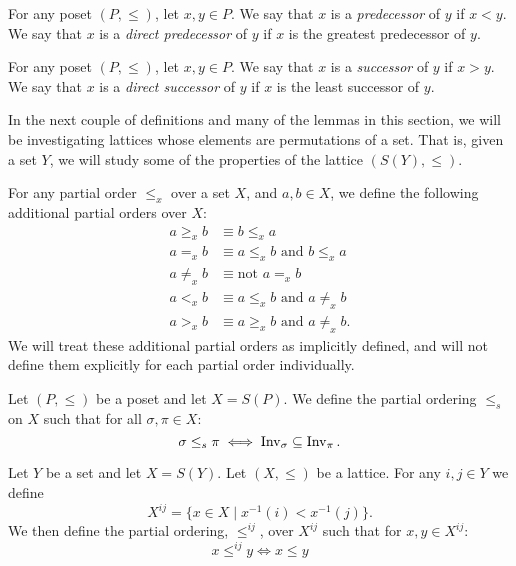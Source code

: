 	\begin{definition}
		For any poset $(P, \le)$, let $x,y \in P$. We say that $x$ is a \emph{predecessor} of $y$ if $x < y$. We say that $x$ is a \emph{direct predecessor} of $y$ if $x$ is the greatest predecessor of $y$.
	\end{definition}

	\begin{definition}
		For any poset $(P, \le)$, let $x,y \in P$. We say that $x$ is a \emph{successor} of $y$ if $x > y$. We say that $x$ is a \emph{direct successor} of $y$ if $x$ is the least successor of $y$.
	\end{definition}

	In the next couple of definitions and many of the lemmas in this section, we will be investigating lattices whose elements are permutations of a set. That is, given a set $Y$, we will study some of the properties of the lattice $(S(Y), \le)$.

	\begin{definition}
		For any partial order $\le_x$ over a set $X$, and $a, b \in X$, we define the following additional partial orders over $X$:
		\begin{align*}
			a \ge_x b &\equiv b \le_x a \\
			a =_x b &\equiv a \le_x b \text{ and } b \le_x a \\
			a \ne_x b &\equiv \text{not } a =_x b \\
			a <_x b &\equiv a \le_x b \text{ and } a \ne_x b \\
			a >_x b &\equiv a \ge_x b \text{ and } a \ne_x b.
		\end{align*}
		We will treat these additional partial orders as implicitly defined, and will not define them explicitly for each partial order individually.
	\end{definition}

	\begin{definition}[$\le_s$]
		\label{partial-order-s-definition}
		Let $(P, \le)$ be a poset and let $X = S(P)$. We define the partial ordering $\le_s$ on $X$ such that for all $\sigma, \pi \in X$:
		\[
			\sigma \le_s \pi \iff \operatorname{Inv}_{\sigma} \subseteq \operatorname{Inv}_{\pi}.
		\]
	\end{definition}

	\begin{definition}[$X^{ij}, \le^{ij}$]
		\label{identified-lattice-definition}
		Let $Y$ be a set and let $X = S(Y)$. Let $(X, \le)$ be a lattice. For any $i,j \in Y$ we define
		\[
			X^{ij} = \{ x \in X \mid x^{-1}(i) < x^{-1}(j) \}.
		\]
		We then define the partial ordering, $\le^{ij}$, over $X^{ij}$ such that for $x, y \in X^{ij}$:
		\[
			x \le^{ij} y \iff x \le y
		\]
	\end{definition}


